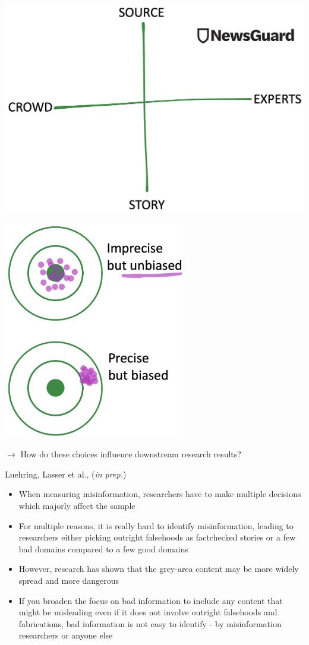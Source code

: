 \documentclass[
  letterpaper,
  DIV=11,
  numbers=noendperiod]{scrartcl}
\begin{document}
\includegraphics[width=31.25in,height=\textheight]{images/newsguard-quadrant.png}

\includegraphics[width=3.125in,height=\textheight]{images/bias.png}

\(\rightarrow\) How do these choices influence downstream research
results?

Luehring, Lasser et al., (\emph{in prep.})

\begin{itemize}
\item
  When measuring misinformation, researchers have to make multiple
  decisions which majorly affect the sample
\item
  For multiple reasons, it is really hard to identify misinformation,
  leading to researchers either picking outright falsehoods as
  factchecked stories or a few bad domains compared to a few good
  domains
\item
  However, research has shown that the grey-area content may be more
  widely spread and more dangerous
\item
  If you broaden the focus on bad information to include any content
  that might be misleading even if it does not involve outright
  falsehoods and fabrications, bad information is not easy to identify -
  by misinformation researchers or anyone else
\end{itemize}
\end{document}

